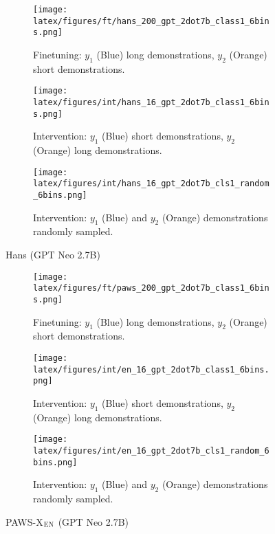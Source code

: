 \begin{figure*}[t!]
    \centering
    \begin{minipage}[t]{\linewidth}
        \begin{subfigure}{0.31\linewidth}
            \centering
            \texttt{[image: latex/figures/ft/hans\_200\_gpt\_2dot7b\_class1\_6bins.png]}
            \caption{Finetuning: $y_1$ (Blue) long demonstrations, $y_2$ (Orange) short demonstrations.}
        \end{subfigure}%
        \hfill
        \begin{subfigure}{0.31\linewidth}
            \centering
            \texttt{[image: latex/figures/int/hans\_16\_gpt\_2dot7b\_class1\_6bins.png]}
            \caption{Intervention: $y_1$ (Blue) short demonstrations, $y_2$ (Orange) long demonstrations.}
        \end{subfigure}
        \hfill
        \begin{subfigure}{0.31\linewidth}
            \centering
            \texttt{[image: latex/figures/int/hans\_16\_gpt\_2dot7b\_cls1\_random\_6bins.png]}
            \caption{Intervention: $y_1$ (Blue) and $y_2$ (Orange) demonstrations randomly sampled.}
        \end{subfigure}
    \end{minipage}%
    \hfill
    \begin{minipage}[c]{\linewidth}
        \caption{Hans (GPT Neo 2.7B)}
    \end{minipage}
\end{figure*}

\begin{figure*}[t!]
    \centering
    \begin{minipage}[t]{\linewidth}
        \begin{subfigure}{0.31\linewidth}
            \centering
            \texttt{[image: latex/figures/ft/paws\_200\_gpt\_2dot7b\_class1\_6bins.png]}
            \caption{Finetuning: $y_1$ (Blue) long demonstrations, $y_2$ (Orange) short demonstrations.}
        \end{subfigure}%
        \hfill
        \begin{subfigure}{0.31\linewidth}
            \centering
            \texttt{[image: latex/figures/int/en\_16\_gpt\_2dot7b\_class1\_6bins.png]}
            \caption{Intervention: $y_1$ (Blue) short demonstrations, $y_2$ (Orange) long demonstrations.}
        \end{subfigure}
        \hfill
        \begin{subfigure}{0.31\linewidth}
            \centering
            \texttt{[image: latex/figures/int/en\_16\_gpt\_2dot7b\_cls1\_random\_6bins.png]}
            \caption{Intervention: $y_1$ (Blue) and $y_2$ (Orange) demonstrations randomly sampled.}
        \end{subfigure}
    \end{minipage}%
    \hfill
    \begin{minipage}[c]{\linewidth}
        \caption{PAWS-X$_{\textsc{EN}}$ (GPT Neo 2.7B)}
    \end{minipage}
\end{figure*}

